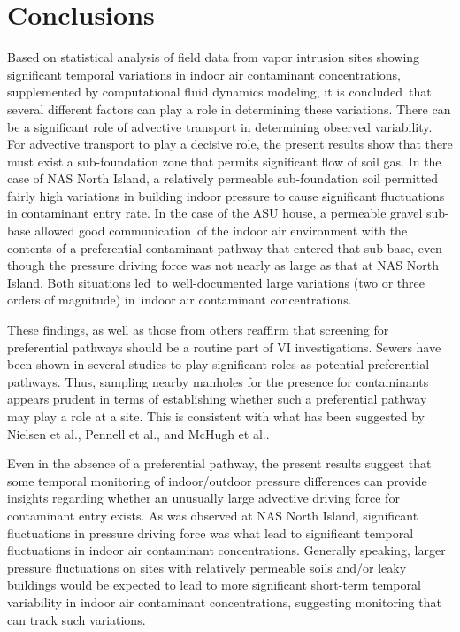 \section{Conclusions}

Based on statistical analysis of field data from vapor intrusion sites showing significant temporal variations in indoor air contaminant concentrations, supplemented by computational fluid dynamics modeling, it is concluded that several different factors can play a role in determining these variations.
There can be a significant role of advective transport in determining observed variability.
For advective transport to play a decisive role, the present results show that there must exist a sub-foundation zone that permits significant flow of soil gas.
In the case of NAS North Island, a relatively permeable sub-foundation soil permitted fairly high variations in building indoor pressure to cause significant fluctuations in contaminant entry rate.
In the case of the ASU house, a permeable gravel sub-base allowed good communication of the indoor air environment with the contents of a preferential contaminant pathway that entered that sub-base, even though the pressure driving force was not nearly as large as that at NAS North Island.
Both situations led to well-documented large variations (two or three orders of magnitude) in indoor air contaminant concentrations.\par

These findings, as well as those from others reaffirm that screening for preferential pathways should be a routine part of VI investigations.
Sewers have been shown in several studies to play significant roles as potential preferential pathways.
Thus, sampling nearby manholes for the presence for contaminants appears prudent in terms of establishing whether such a preferential pathway may play a role at a site.
This is consistent with what has been suggested by Nielsen et al.\cite{nielsen_remediation_2017}, Pennell et al.\cite{pennell_sewer_2013}, and McHugh et al.\cite{mchugh_evidence_2017}.\par

Even in the absence of a preferential pathway, the present results suggest that some temporal monitoring of indoor/outdoor pressure differences can provide insights regarding whether an unusually large advective driving force for contaminant entry exists.
As was observed at NAS North Island, significant fluctuations in pressure driving force was what lead to significant temporal fluctuations in indoor air contaminant concentrations.
Generally speaking, larger pressure fluctuations on sites with relatively permeable soils and/or leaky buildings would be expected to lead to more significant short-term temporal variability in indoor air contaminant concentrations, suggesting monitoring that can track such variations.\par

